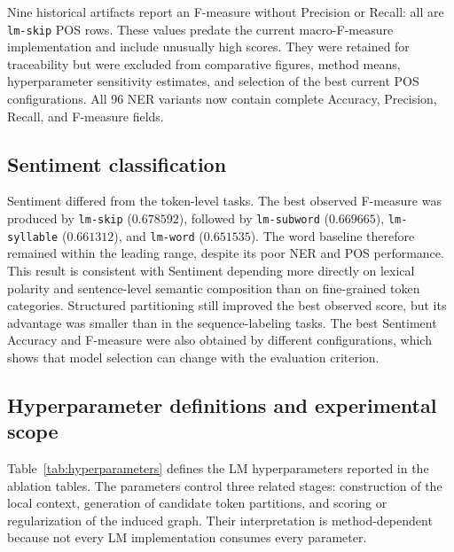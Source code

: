Nine historical artifacts report an F-measure without Precision or Recall:
all are \texttt{lm-skip} POS rows. These values predate the current
macro-F-measure implementation and include unusually high scores. They were
retained for traceability but were excluded from comparative figures, method
means, hyperparameter sensitivity estimates, and selection of the best
current POS configurations. All 96 NER variants now contain complete
Accuracy, Precision, Recall, and F-measure fields.

\subsection{Sentiment classification}

Sentiment differed from the token-level tasks. The best observed F-measure was
produced by \texttt{lm-skip} ($0.678592$), followed by
\texttt{lm-subword} ($0.669665$), \texttt{lm-syllable} ($0.661312$), and
\texttt{lm-word} ($0.651535$). The word baseline therefore remained within
the leading range, despite its poor NER and POS performance. This result is
consistent with Sentiment depending more directly on lexical polarity and
sentence-level semantic composition than on fine-grained token categories.
Structured partitioning still improved the best observed score, but its
advantage was smaller than in the sequence-labeling tasks. The best Sentiment
Accuracy and F-measure were also obtained by different configurations, which
shows that model selection can change with the evaluation criterion.

\subsection{Hyperparameter definitions and experimental scope}

Table~\ref{tab:hyperparameters} defines the LM hyperparameters reported in the
ablation tables. The parameters control three related stages: construction of
the local context, generation of candidate token partitions, and scoring or
regularization of the induced graph. Their interpretation is
method-dependent because not every LM implementation consumes every
parameter.


